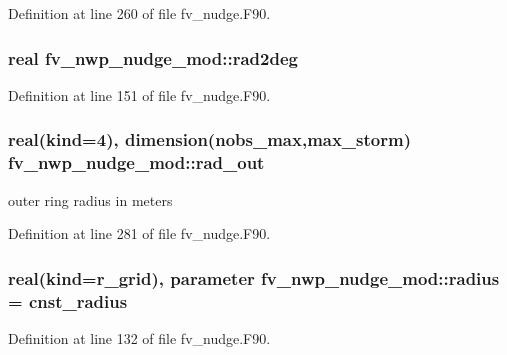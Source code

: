 Definition at line 260 of file fv\-\_\-nudge.\-F90.

\subsubsection[{rad2deg}]{\setlength{\rightskip}{0pt plus 5cm}real fv\-\_\-nwp\-\_\-nudge\-\_\-mod\-::rad2deg\hspace{0.3cm}{\ttfamily [private]}}\label{classfv__nwp__nudge__mod_a2b54722a648c7b5841e3a2138d55ac5f}


Definition at line 151 of file fv\-\_\-nudge.\-F90.

\subsubsection[{rad\-\_\-out}]{\setlength{\rightskip}{0pt plus 5cm}real(kind=4), dimension({\bf nobs\-\_\-max},{\bf max\-\_\-storm}) fv\-\_\-nwp\-\_\-nudge\-\_\-mod\-::rad\-\_\-out\hspace{0.3cm}{\ttfamily [private]}}\label{classfv__nwp__nudge__mod_a406dba8bb90cbab343bb92bf5cef1f58}


outer ring radius in meters 



Definition at line 281 of file fv\-\_\-nudge.\-F90.

\subsubsection[{radius}]{\setlength{\rightskip}{0pt plus 5cm}real(kind=r\-\_\-grid), parameter fv\-\_\-nwp\-\_\-nudge\-\_\-mod\-::radius = cnst\-\_\-radius\hspace{0.3cm}{\ttfamily [private]}}\label{classfv__nwp__nudge__mod_a558bf04275fcbb1d8f4debc8cca46876}


Definition at line 132 of file fv\-\_\-nudge.\-F90.


